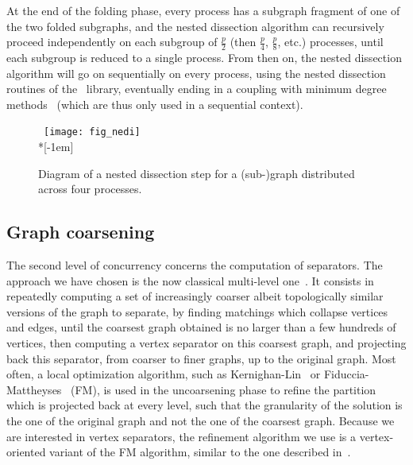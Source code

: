\documentclass[fleqn,12pt,twoside]{article}
\begin{document}
At the end of the folding phase, every process has a
subgraph fragment of one of the two folded subgraphs, and the nested
dissection algorithm can recursively proceed independently on each
subgroup of $\frac{p}{2}$ (then $\frac{p}{4}$, $\frac{p}{8}$,
etc\@.) processes, until each subgroup is reduced to a single
process. From then on, the nested dissection algorithm will go on
sequentially on every process, using the nested dissection routines
of the \scotch\ library, eventually ending in a coupling with minimum
degree methods~\cite{peroam00a} (which are thus only used in a
sequential context).

\begin{figure}
~\hfill \texttt{[image: fig\_nedi]}
\hfill~\\*[-1em]
\caption{Diagram of a nested dissection step for a (sub-)graph
  distributed across four processes.}
\label{fig-nedi}
\end{figure}

\subsection{Graph coarsening}
\label{secalgocoarsen}

The second level of concurrency concerns the computation of
separators. The approach we have chosen is the now classical
multi-level one~\cite{basi94,hele95,kaku98a}. It consists in
repeatedly computing a set of increasingly coarser albeit
topologically similar versions of the graph to separate, by finding
matchings which collapse vertices and edges, until the coarsest graph
obtained is no larger than a few hundreds of vertices, then computing
a vertex separator on this coarsest graph, and projecting back this
separator, from coarser to finer graphs, up to the original graph.
Most often, a local optimization algorithm, such as
Kernighan-Lin~\cite{keli70} or Fiduccia-Mattheyses~\cite{fima82} (FM),
is used in the uncoarsening phase to refine the partition which is
projected back at every level, such that the granularity of the
solution is the one of the original graph and not the one of the
coarsest graph. Because we are interested in vertex separators, the
refinement algorithm we use is a vertex-oriented variant of the FM
algorithm, similar to the one described in~\cite{hero98}.
\end{document}
